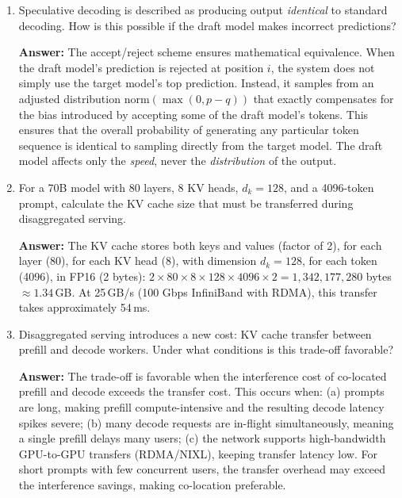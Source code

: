 \begin{enumerate}
  \textbf{Answer:} Throughput improves because completed requests are immediately evicted and their slots refilled with new requests, keeping the batch full at all times. Under static batching, completed requests waste GPU cycles until the longest request finishes. Latency improves because short requests are returned as soon as they finish generating, rather than waiting for the longest request in the batch. A 10-token request in a static batch with a 1{,}000-token request waits 1{,}000 iterations; with continuous batching, it waits only 10.

  \item Speculative decoding is described as producing output \emph{identical} to standard decoding. How is this possible if the draft model makes incorrect predictions?

  \textbf{Answer:} The accept/reject scheme ensures mathematical equivalence. When the draft model's prediction is rejected at position $i$, the system does not simply use the target model's top prediction. Instead, it samples from an adjusted distribution $\text{norm}(\max(0, p - q))$ that exactly compensates for the bias introduced by accepting some of the draft model's tokens. This ensures that the overall probability of generating any particular token sequence is identical to sampling directly from the target model. The draft model affects only the \emph{speed}, never the \emph{distribution} of the output.

  \item For a 70B model with 80 layers, 8 KV heads, $d_k = 128$, and a 4096-token prompt, calculate the KV cache size that must be transferred during disaggregated serving.

  \textbf{Answer:} The KV cache stores both keys and values (factor of 2), for each layer (80), for each KV head (8), with dimension $d_k = 128$, for each token (4096), in FP16 (2 bytes): $2 \times 80 \times 8 \times 128 \times 4096 \times 2 = 1{,}342{,}177{,}280$ bytes $\approx 1.34$\,GB. At 25\,GB/s (100 Gbps InfiniBand with RDMA), this transfer takes approximately 54\,ms.

  \item Disaggregated serving introduces a new cost: KV cache transfer between prefill and decode workers. Under what conditions is this trade-off favorable?

  \textbf{Answer:} The trade-off is favorable when the interference cost of co-located prefill and decode exceeds the transfer cost. This occurs when: (a) prompts are long, making prefill compute-intensive and the resulting decode latency spikes severe; (b) many decode requests are in-flight simultaneously, meaning a single prefill delays many users; (c) the network supports high-bandwidth GPU-to-GPU transfers (RDMA/NIXL), keeping transfer latency low. For short prompts with few concurrent users, the transfer overhead may exceed the interference savings, making co-location preferable.


\end{enumerate}
